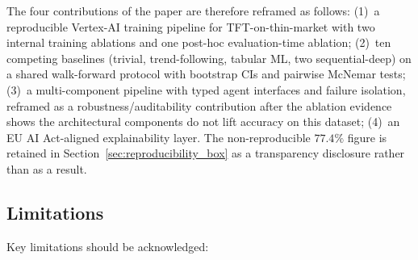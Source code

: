\documentclass[conference]{IEEEtran}
\begin{document}
The four contributions of the paper are therefore reframed as follows: (1)~a reproducible Vertex-AI training pipeline for TFT-on-thin-market with two internal training ablations and one post-hoc evaluation-time ablation; (2)~ten competing baselines (trivial, trend-following, tabular ML, two sequential-deep) on a shared walk-forward protocol with bootstrap CIs and pairwise McNemar tests; (3)~a multi-component pipeline with typed agent interfaces and failure isolation, reframed as a robustness/auditability contribution after the ablation evidence shows the architectural components do not lift accuracy on this dataset; (4)~an EU AI Act-aligned explainability layer. The non-reproducible $77.4\%$ figure is retained in Section~\ref{sec:reproducibility_box} as a transparency disclosure rather than as a result.

\subsection{Limitations}

Key limitations should be acknowledged:
\end{document}
